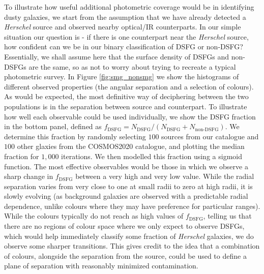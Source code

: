 To illustrate how useful additional photometric coverage would be in identifying dusty galaxies, we start from the assumption that we have already detected a \textit{Herschel} source and observed nearby optical/IR counterparts. In our simple situation our question is - if there is one counterpart near the \textit{Herschel} source, how confident can we be in our binary classification of DSFG or non-DSFG? Essentially, we shall assume here that the surface density of DSFGs and non-DSFGs are the same, so as not to worry about trying to recreate a typical photometric survey. In Figure \ref{fig:smg_nonsmg} we show the histograms of different observed properties (the angular separation and a selection of colours). As would be expected, the most definitive way of deciphering between the two populations is in the separation between source and counterpart. To illustrate how well each observable could be used individually, we show the DSFG fraction in the bottom panel, defined as $f_\textrm{DSFG} = N_\textrm{DSFG}/(N_\textrm{DSFG}+N_\textrm{non-DSFG})$. We determine this fraction by randomly selecting $100$ sources from our catalogue and $100$ other glaxies from the COSMOS2020 catalogue, and plotting the median fraction for $1,000$ iterations. We then modelled this fraction using a sigmoid function. The most effective observables would be those in which we observe a sharp change in $f_\textrm{DSFG}$ between a very high and very low value. While the radial separation varies from very close to one at small radii to zero at high radii, it is slowly evolving (as background galaxies are observed with a predictable radial dependence, unlike colours where they may have preference for particular ranges). While the colours typically do not reach as high values of $f_\textrm{DSFG}$, telling us that there are no regions of colour space where we only expect to observe DSFGs, which would help immediately classify some fraction of \textit{Herschel} galaxies, we do observe some sharper transitions. This gives credit to the idea that a combination of colours, alongside the separation from the source, could be used to define a plane of separation with reasonably minimized contamination.

